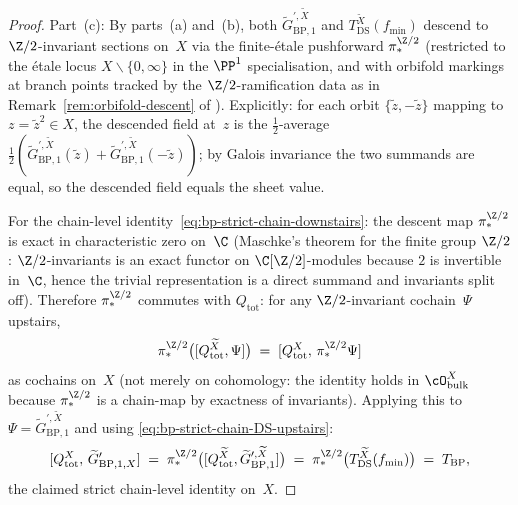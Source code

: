 \begin{proof}
Part~(c): By parts~(a) and~(b), both
$\widetilde G^{\prime, \widetilde X}_{\mathrm{BP}, 1}$ and
$T_{\mathrm{DS}}^{\widetilde X}(f_{\min})$ descend to
$\Z/2$-invariant sections on~$X$ via the finite-\'etale pushforward
$\pi_{\ast}^{\Z/2}$ (restricted to the \'etale locus
$X \smallsetminus \{0, \infty\}$ in the $\PP^1$ specialisation,
and with orbifold markings at branch points tracked by the
$\Z/2$-ramification data as in
Remark~\ref{rem:orbifold-descent} of
\cite[\S\ref*{subsec:galois-descent}]{Vol2-fractional-ghost-platonic}).
Explicitly: for each orbit $\{\tilde z, -\tilde z\}$ mapping to
$z = \tilde z^2 \in X$, the descended field at~$z$ is the
$\tfrac 12$-average
$\tfrac 12 (\widetilde G^{\prime, \widetilde X}_{\mathrm{BP}, 1}(\tilde z)
 + \widetilde G^{\prime, \widetilde X}_{\mathrm{BP}, 1}(-\tilde z))$;
by Galois invariance the two summands are equal, so the descended
field equals the sheet value.

For the chain-level identity~\eqref{eq:bp-strict-chain-downstairs}:
the descent map $\pi_{\ast}^{\Z/2}$ is exact in characteristic
zero on~$\C$ (Maschke's theorem for the finite group
$\Z/2$: $\Z/2$-invariants is an exact functor on
$\C[\Z/2]$-modules because $2$ is invertible in~$\C$,
hence the trivial representation is a direct summand and invariants
split off). Therefore $\pi_{\ast}^{\Z/2}$ commutes with
$Q_{\mathrm{tot}}$: for any $\Z/2$-invariant cochain~$\Psi$
upstairs,
\[
 \pi_{\ast}^{\Z/2}\bigl([Q_{\mathrm{tot}}^{\widetilde X}, \Psi]\bigr)
 \;=\; [Q_{\mathrm{tot}}^{X},\, \pi_{\ast}^{\Z/2}\Psi]
\]
as cochains on~$X$ (not merely on cohomology: the identity holds
in $\cO_{\mathrm{bulk}}^{X}$ because $\pi_{\ast}^{\Z/2}$ is a
chain-map by exactness of invariants). Applying this to
$\Psi = \widetilde G^{\prime, \widetilde X}_{\mathrm{BP}, 1}$ and
using \eqref{eq:bp-strict-chain-DS-upstairs}:
\[
 [Q_{\mathrm{tot}}^{X},\, \widetilde G^{\prime}_{\mathrm{BP}, 1, X}]
 \;=\; \pi_{\ast}^{\Z/2}\bigl(
 [Q_{\mathrm{tot}}^{\widetilde X}, \widetilde G^{\prime, \widetilde X}_{\mathrm{BP}, 1}]
 \bigr)
 \;=\; \pi_{\ast}^{\Z/2}\bigl(T_{\mathrm{DS}}^{\widetilde X}(f_{\min})\bigr)
 \;=\; T_{\mathrm{BP}},
\]
the claimed strict chain-level identity on~$X$.
\end{proof}

